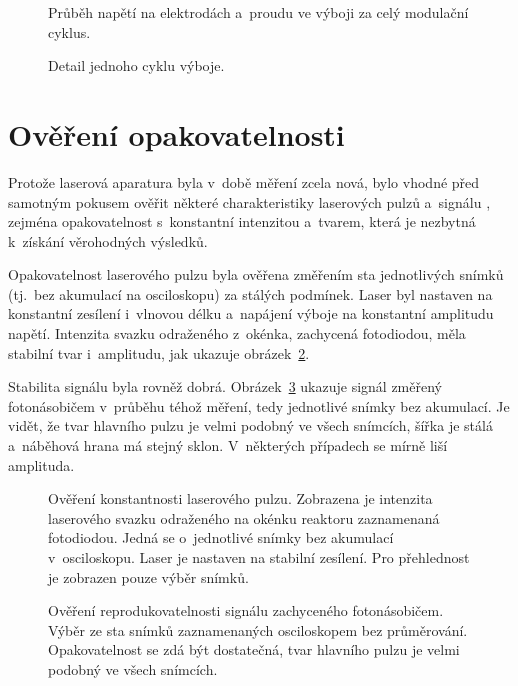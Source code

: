 \begin{figure}[htp]
	\centering
	
	\caption{Průběh napětí na elektrodách a~proudu ve výboji
		za celý modulační cyklus.}
	\label{fig:efish-overview-full}
	\vspace{24pt}
	
	\caption{Detail jednoho cyklu výboje.}
	\label{fig:efish-overview-period}
\end{figure}

\section{Ověření opakovatelnosti}
\label{sec:efish-check}
Protože laserová aparatura byla v~době měření zcela nová,
bylo vhodné před samotným pokusem ověřit některé charakteristiky
laserových pulzů a~signálu \EFISH{},
zejména opakovatelnost s~konstantní intenzitou a~tvarem,
která je nezbytná k~získání věrohodných výsledků.

Opakovatelnost laserového pulzu byla ověřena změřením sta jednotlivých
snímků (tj.~bez akumulací na osciloskopu) za stálých podmínek.
Laser byl nastaven na konstantní zesílení i~vlnovou délku
a~napájení výboje na konstantní amplitudu napětí.
Intenzita svazku odraženého z~okénka, zachycená fotodiodou,
měla stabilní tvar i~amplitudu, jak ukazuje
obrázek~\ref{fig:efish-pulse-compare}.

Stabilita signálu \EFISH{} byla rovněž dobrá.
Obrázek~\ref{fig:efish-singleshots-compare} ukazuje signál
\EFISH{} změřený fotonásobičem v~průběhu téhož měření,
tedy jednotlivé snímky bez akumulací.
Je vidět, že tvar hlavního pulzu je velmi podobný ve všech snímcích,
šířka je stálá a~náběhová hrana má stejný sklon.
V~některých případech se mírně liší amplituda.

\begin{figure}[htp]
	\centering
	
	\caption{Ověření konstantnosti laserového pulzu.
		Zobrazena je intenzita laserového svazku odraženého
		na okénku reaktoru zaznamenaná fotodiodou.
		Jedná se o~jednotlivé snímky bez akumulací v~osciloskopu.
		Laser je nastaven na stabilní zesílení.
		Pro přehlednost je zobrazen pouze výběr snímků.}
	\label{fig:efish-pulse-compare}
\end{figure}

\begin{figure}[htp]
	\centering
	
	\caption{Ověření reprodukovatelnosti signálu \EFISH{} zachyceného
		fotonásobičem.
		Výběr ze sta snímků zaznamenaných osciloskopem bez průměrování.
		Opakovatelnost se zdá být dostatečná,
		tvar hlavního pulzu je velmi podobný ve všech snímcích.}
	\label{fig:efish-singleshots-compare}
\end{figure}

